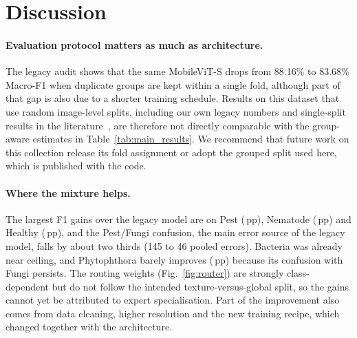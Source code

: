 \section{Discussion}\label{sec:discussion}

\paragraph{Evaluation protocol matters as much as architecture.}
The legacy audit shows that the same MobileViT-S drops from 88.16\% to 83.68\% Macro-F1 when
duplicate groups are kept within a single fold, although part of that gap is also due to a shorter
training schedule. Results on this dataset that use random image-level splits, including our own
legacy numbers and single-split results in the literature~\cite{hoang2026asmoe,saleh2025hybrid},
are therefore not directly comparable with the group-aware estimates in
Table~\ref{tab:main_results}. We recommend that future work on this collection release its fold
assignment or adopt the grouped split used here, which is published with the code.

\paragraph{Where the mixture helps.}
The largest F1 gains over the legacy model are on Pest (\DeltaFOnePest\,pp), Nematode
(\DeltaFOneNematode\,pp) and Healthy (\DeltaFOneHealthy\,pp), and the Pest/Fungi confusion,
the main error source of the legacy model, falls by about two thirds (145 to 46 pooled errors).
Bacteria was already near ceiling, and Phytophthora barely improves (\DeltaFOnePhytopthora\,pp)
because its confusion with Fungi persists. The routing weights (Fig.~\ref{fig:router}) are
strongly class-dependent but do not follow the intended texture-versus-global split, so the gains
cannot yet be attributed to expert specialisation. Part of the improvement also comes from data
cleaning, higher resolution and the new training recipe, which changed together with the
architecture.

